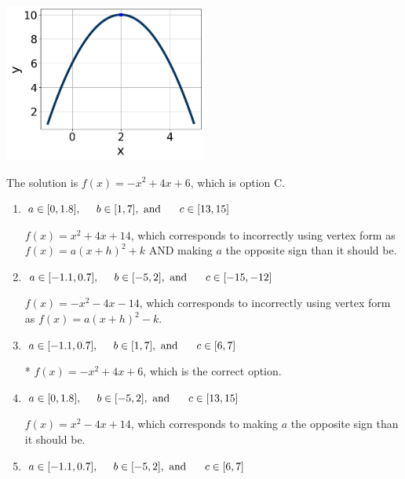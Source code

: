 \documentclass{extbook}[14pt]
\begin{document}
\begin{enumerate}
{\begin{center}
    \includegraphics[width=0.5\textwidth]{../Figures/quadraticGraphToEquationCopyA.png}
\end{center}



The solution is \( f(x) = -x^{2} +4 x + 6 \), which is option C.\begin{enumerate}[label=\Alph*.]
\item \( a \in [0, 1.8], \hspace*{5mm} b \in [1, 7], \text{ and } \hspace*{5mm} c \in [13, 15] \)

$f(x)=x^{2} +4 x + 14$, which corresponds to incorrectly using vertex form as $f(x) = a(x+h)^2+k$ AND making $a$ the opposite sign than it should be.
\item \( a \in [-1.1, 0.7], \hspace*{5mm} b \in [-5, 2], \text{ and } \hspace*{5mm} c \in [-15, -12] \)

$f(x)=-x^{2} -4 x -14$, which corresponds to incorrectly using vertex form as $f(x) = a(x+h)^2 - k$.
\item \( a \in [-1.1, 0.7], \hspace*{5mm} b \in [1, 7], \text{ and } \hspace*{5mm} c \in [6, 7] \)

* $f(x)=-x^{2} +4 x + 6$, which is the correct option.
\item \( a \in [0, 1.8], \hspace*{5mm} b \in [-5, 2], \text{ and } \hspace*{5mm} c \in [13, 15] \)

$f(x)=x^{2} -4 x + 14$, which corresponds to making $a$ the opposite sign than it should be.
\item \( a \in [-1.1, 0.7], \hspace*{5mm} b \in [-5, 2], \text{ and } \hspace*{5mm} c \in [6, 7] \)


\end{enumerate}}
\end{enumerate}
\end{document}
